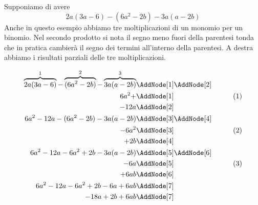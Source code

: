 \begin{esempio}
Supponiamo di avere \[2a(3a-6)-(6a^2-2b)-3a(a-2b)\]
Anche in questo esempio abbiamo tre moltiplicazioni di un monomio per un binomio. Nel secondo prodotto si nota il segno meno fuori della parentesi tonda che in pratica cambierà il segno dei termini all'interno della parentesi. A destra abbiamo  i risultati parziali delle tre moltiplicazioni.
\begin{NodesList}
	\begin{align*}
\overbrace{2a(3a-6)}^{1}-\overbrace{(6a^2-2b)}^{2}-\overbrace{3a(a-2b)}^{3}&\AddNode[1]\AddNode[2]\\ %
		6a^2+&\AddNode[1]&\tag{1}\\%
		-12a&\AddNode[2]&\\ %
		6a^2-12a-(6a^2-2b)-3a(a-2b)&\AddNode[3]\AddNode[4]\\
		-6a^2&\AddNode[3]&\tag{2}\\    
		+2b&\AddNode[4]&\\
		6a^2-12a-6a^2+2b-3a(a-2b)&\AddNode[5]\AddNode[6]\\
		-6a&\AddNode[5]&\tag{3}\\
		+6ab&\AddNode[6]&\\
		6a^2-12a-6a^2+2b-6a+6ab&\AddNode[7]\\   
		-18a+2b+6ab&\AddNode[7]   
	\end{align*}
\end{NodesList}
\end{esempio}
